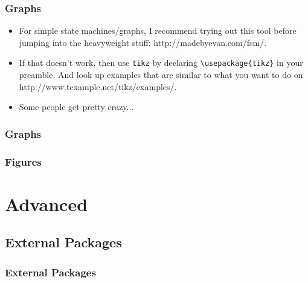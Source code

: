 \documentclass{beamer}
\begin{document}
\begin{frame}[fragile]
  \frametitle{Graphs}
  \begin{itemize}
    \item For simple state machines/graphs, I recommend trying out this tool before jumping into the heavyweight stuff: http://madebyevan.com/fsm/.
    \item If that doesn't work, then use \verb.tikz. by declaring \verb.\usepackage{tikz}. in your preamble. And look up examples that are similar to what you want to do on http://www.texample.net/tikz/examples/.
    \item Some people get pretty crazy...
  \end{itemize}
\end{frame}
\begin{frame}[fragile]
  \frametitle{Graphs}
  \centering
\end{frame}
\begin{frame}[fragile]
  \frametitle{Figures}
\end{frame}

\section{Advanced}

\subsection{External Packages}
\begin{frame}
	\frametitle{External Packages}
\end{frame}
\end{document}
